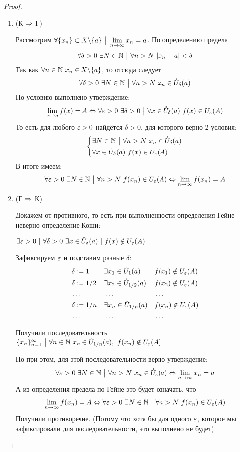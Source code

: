 \begin{proof}
	\begin{enumerate}
		\item (К $\Rightarrow$ Г)
		
		Рассмотрим $\forall \{x_n\} \subset X \backslash \{a\} \ \big|\  \lim\limits_{n \to \infty} x_n = a$. По определению предела
		$$
			\forall \delta > 0\ \exists N \in \mathbb{N} \ \big|\  \forall n > N\ |x_n - a| < \delta
		$$
		Так как $\forall n \in \mathbb{N}\ x_n \in X \backslash \{a\}$, то отсюда следует
		$$
			\forall \delta > 0\ \exists N \in \N \such \forall n > N\ x_n \in \mc{U}_{\delta}(a)
		$$
		По условию выполнено утверждение:
		$$
			\lim\limits_{x \to a} f(x) = A \Leftrightarrow \forall \varepsilon > 0\ \exists \delta > 0 \ \big|\  \forall x \in \mathring{U}_{\delta}(a)\ f(x) \in U_{\varepsilon}(A)
		$$
		То есть для любого $\varepsilon > 0$ найдётся $\delta > 0$, для которого верно 2 условия:
		$$
		\left\{\begin{aligned}
			&{\exists N \in \mathbb{N} \ \big|\  \forall n > N\ x_n \in \mathring{U}_{\delta}(a)}
			\\
			&{\forall x \in \mathring{U}_{\delta}(a)\ f(x) \in U_{\varepsilon}(A)}
		\end{aligned}\right.
		$$
		В итоге имеем:
		$$
			\forall \varepsilon > 0\ \exists N \in \mathbb{N} \ \big|\  \forall n > N\ f(x_n) \in U_{\varepsilon}(A) \Leftrightarrow \lim\limits_{n \to \infty} f(x_n) = A
		$$
		
		\item (Г $\Rightarrow$ К)
		
		Докажем от противного, то есть при выполненности определения Гейне неверно определение Коши:
		
		$\exists \varepsilon > 0\ |\ \forall \delta > 0\ \exists x \in \mathring{U}_{\delta}(a)\ |\ f(x) \notin U_{\varepsilon}(A)$
		
		Зафиксируем $\varepsilon$ и подставим разные $\delta$:
		\begin{align*}
			&\delta := 1 & &{\exists x_1 \in \mathring{U}_{1}(a)} & &{f(x_1) \notin U_{\varepsilon}(A)}
			\\
			&\delta := 1/2 & &{\exists x_2 \in \mathring{U}_{1/2}(a)} & &{f(x_2) \notin U_{\varepsilon}(A)}
			\\
			&\dots & &\dots & &\dots
			\\
			&\delta := 1/n & &{\exists x_n \in \mathring{U}_{1/n}(a)} & &{f(x_n) \notin U_{\varepsilon}(A)}
			\\
			&\dots & &\dots & &\dots
		\end{align*}
		
		Получили последовательность $\{x_n\}_{n = 1}^\infty \ \big|\  \forall n \in \mathbb{N}\ x_n \in \mathring{U}_{1/n}(a),\ f(x_n) \notin U_{\varepsilon}(A)$
		
		Но при этом, для этой последовательности верно утверждение:
		$$
			\forall \varepsilon > 0\ \exists N \in \mathbb{N} \ \big|\  \forall n > N\ x_n \in \mathring{U}_{\varepsilon}(a) \Leftrightarrow \lim\limits_{n \to \infty} x_n = a
		$$
		А из определения предела по Гейне это будет означать, что
		$$
			\lim\limits_{n \to \infty} f(x_n) = A \Leftrightarrow \forall \varepsilon > 0\ \exists N \in \mathbb{N} \ \big|\  \forall n > N\ f(x_n) \in U_{\varepsilon} (A)
		$$
		Получили противоречие. (Потому что хотя бы для одного $\varepsilon$, которое мы зафиксировали для последовательности, это выполнено не будет)
	\end{enumerate}
\end{proof}

